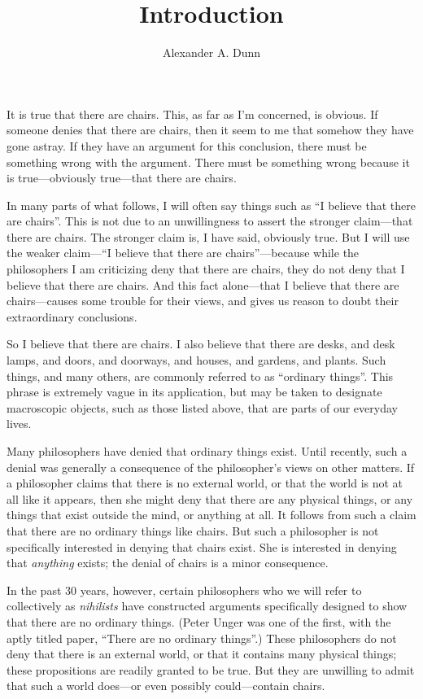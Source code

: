 \documentclass[11pt]{article}
\title{Introduction}
\author{Alexander A. Dunn}
\begin{document}
\ifstandalone
\maketitle
\begin{spacing}{1.5}
\fi

It is true that there are chairs.  This, as far as I'm concerned, is
obvious.  If someone denies that there are chairs, then it seem to me
that somehow they have gone astray.  If they have an argument for this
conclusion, there must be something wrong with the argument.  There
must be something wrong because it is true---obviously true---that
there are chairs.

In many parts of what follows, I will often say things such as ``I
believe that there are chairs''.  This is not due to an unwillingness
to assert the stronger claim---that there are chairs.  The stronger
claim is, I have said, obviously true.  But I will use the weaker
claim---``I believe that there are chairs''---because while the
philosophers I am criticizing deny that there are chairs, they do not
deny that I believe that there are chairs.  And this fact alone---that
I believe that there are chairs---causes some trouble for their views,
and gives us reason to doubt their extraordinary conclusions.

So I believe that there are chairs.  I also believe that there are
desks, and desk lamps, and doors, and doorways, and houses, and
gardens, and plants.  Such things, and many others, are commonly
referred to as ``ordinary things''.  This phrase is extremely vague in
its application, but may be taken to designate macroscopic objects,
such as those listed above, that are parts of our everyday lives.

Many philosophers have denied that ordinary things exist.  Until
recently, such a denial was generally a consequence of the
philosopher's views on other matters.  If a philosopher claims that
there is no external world, or that the world is not at all like it
appears, then she might deny that there are any physical things, or
any things that exist outside the mind, or anything at all.  It
follows from such a claim that there are no ordinary things like
chairs.  But such a philosopher is not specifically interested in
denying that chairs exist.  She is interested in denying that {\em
  anything} exists; the denial of chairs is a minor consequence.

In the past 30 years, however, certain philosophers who we will refer
to collectively as {\em nihilists} have constructed arguments
specifically designed to show that there are no ordinary things.
(Peter Unger was one of the first, with the aptly titled paper,
``There are no ordinary things''.)  These philosophers do not deny
that there is an external world, or that it contains many physical
things; these propositions are readily granted to be true.  But they
are unwilling to admit that such a world does---or even possibly
could---contain chairs.


\end{spacing}
\end{document}
